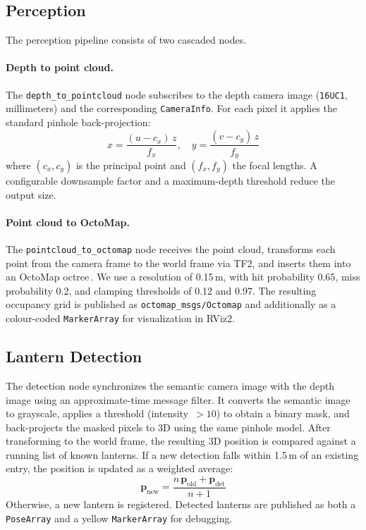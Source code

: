 \documentclass[twocolumn]{article}
\begin{document}
\subsection{Perception}

The perception pipeline consists of two cascaded nodes.

\paragraph{Depth to point cloud.}
The \texttt{depth\_to\_pointcloud} node subscribes to the depth camera image (\texttt{16UC1}, millimeters) and the corresponding \texttt{CameraInfo}.
For each pixel it applies the standard pinhole back-projection:
\begin{equation}
  x = \frac{(u - c_x)\,z}{f_x}, \quad
  y = \frac{(v - c_y)\,z}{f_y}
\end{equation}
where $(c_x, c_y)$ is the principal point and $(f_x, f_y)$ the focal lengths.
A configurable downsample factor and a maximum-depth threshold reduce the output size.

\paragraph{Point cloud to OctoMap.}
The \texttt{pointcloud\_to\_octomap} node receives the point cloud, transforms each point from the camera frame to the world frame via TF2, and inserts them into an OctoMap octree\,\cite{Hornung2013}.
We use a resolution of 0.15\,m, with hit probability 0.65, miss probability 0.2, and clamping thresholds of 0.12 and 0.97.
The resulting occupancy grid is published as \texttt{octomap\_msgs/Octomap} and additionally as a colour-coded \texttt{MarkerArray} for visualization in RViz2.

\subsection{Lantern Detection}

The detection node synchronizes the semantic camera image with the depth image using an approximate-time message filter.
It converts the semantic image to grayscale, applies a threshold (intensity~$>10$) to obtain a binary mask, and back-projects the masked pixels to 3D using the same pinhole model.
After transforming to the world frame, the resulting 3D position is compared against a running list of known lanterns.
If a new detection falls within 1.5\,m of an existing entry, the position is updated as a weighted average:
\begin{equation}
  \mathbf{p}_{\text{new}} = \frac{n\,\mathbf{p}_{\text{old}} + \mathbf{p}_{\text{det}}}{n + 1}
\end{equation}
Otherwise, a new lantern is registered.
Detected lanterns are published as both a \texttt{PoseArray} and a yellow \texttt{MarkerArray} for debugging.
\end{document}
